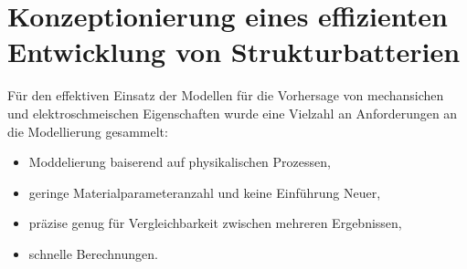 \section{\label{sec:efficent_development}Konzeptionierung eines effizienten Entwicklung von Strukturbatterien}
Für den effektiven Einsatz der Modellen für die Vorhersage von mechansichen und elektroschmeischen Eigenschaften wurde eine Vielzahl an Anforderungen an die Modellierung gesammelt:
\begin{itemize}
    \item Moddelierung baiserend auf physikalischen Prozessen, %
    \item geringe Materialparameteranzahl und keine Einführung Neuer, %
    \item präzise genug für Vergleichbarkeit zwischen mehreren Ergebnissen, %
    \item schnelle Berechnungen. %
\end{itemize} 

